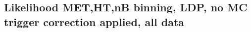 \documentclass[11pt]{article}
\begin{document}
    \clearpage














    \subsection{ Likelihood MET,HT,nB binning, LDP, no MC trigger correction applied, all data}
\end{document}
